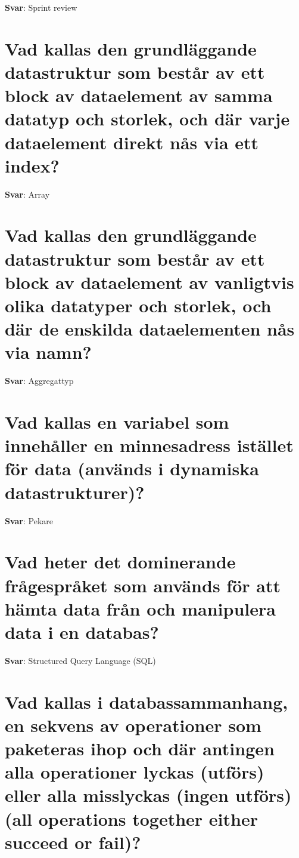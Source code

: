 \documentclass[a4paper,11pt,oneside]{book}
\begin{document}
\begin{sloppypar}
\label{q:50:sa:sv:True}

\textbf{Svar}: Sprint review



\section{Vad kallas den grundl\"aggande datastruktur som best\r{a}r av ett block av dataelement av samma datatyp och storlek, och d\"ar varje dataelement direkt n\r{a}s via ett index?}

\label{q:51:sa:sv:True}

\textbf{Svar}: Array



\section{Vad kallas den grundl\"aggande datastruktur som best\r{a}r av ett block av dataelement av vanligtvis olika datatyper och storlek, och d\"ar de enskilda dataelementen n\r{a}s via namn?}

\label{q:52:sa:sv:True}

\textbf{Svar}: Aggregattyp



\section{Vad kallas en variabel som inneh\r{a}ller en minnesadress ist\"allet f\"or data (anv\"ands i dynamiska datastrukturer)?}

\label{q:53:sa:sv:True}

\textbf{Svar}: Pekare



\section{Vad heter det dominerande fr\r{a}gespr\r{a}ket som anv\"ands f\"or att h\"amta data fr\r{a}n och manipulera data i en databas?}

\label{q:54:sa:sv:True}

\textbf{Svar}: Structured Query Language (SQL)



\section{Vad kallas i databassammanhang, en sekvens av operationer som paketeras ihop och d\"ar antingen alla operationer lyckas (utf\"ors) eller alla misslyckas (ingen utf\"ors) (all operations together either succeed or fail)?}


\end{sloppypar}
\end{document}

